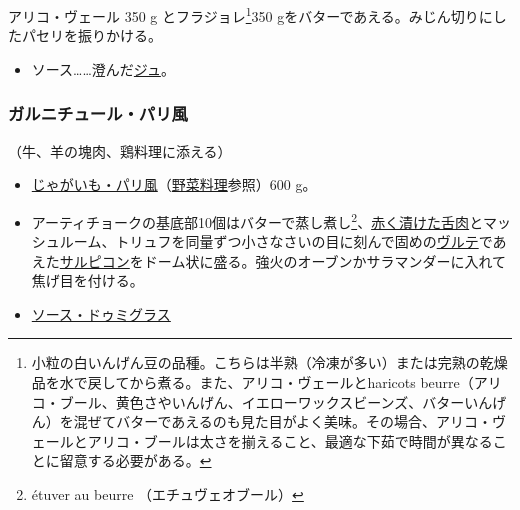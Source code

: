 \begin{recette}


アリコ・ヴェール 350 g とフラジョレ\footnote{小粒の白いんげん豆の品種。こちらは半熟（冷凍が多い）または完熟の乾燥品を水で戻してから煮る。また、アリコ・ヴェールとharicots
  beurre（アリコ・ブール、黄色さやいんげん、イエローワックスビーンズ、バターいんげん）を混ぜてバターであえるのも見た目がよく美味。その場合、アリコ・ヴェールとアリコ・ブールは太さを揃えること、最適な下茹で時間が異なることに留意する必要がある。}350
gをバターであえる。みじん切りにしたパセリを振りかける。

\begin{itemize}
\tightlist
\item
  ソース\ldots{}\ldots{}澄んだ\protect\hyperlink{jus-de-veau-lie}{ジュ}。
\end{itemize}

\hypertarget{garniture-a-la-parisienne}{%
\subsubsection{ガルニチュール・パリ風}\label{garniture-a-la-parisienne}}



（牛、羊の塊肉、鶏料理に添える）

\begin{itemize}
\item
  \protect\hyperlink{pommes-de-terre-a-la-parisienne}{じゃがいも・パリ風}（\protect\hyperlink{legumes}{野菜料理}参照）600
  g。
\item
  アーティチョークの基底部10個はバターで蒸し煮し\footnote{étuver au
    beurre （エチュヴェオブール）}、\protect\hyperlink{saumure-liquide-pour-langues}{赤く漬けた舌肉}とマッシュルーム、トリュフを同量ずつ小さなさいの目に刻んで固めの\protect\hyperlink{veloute}{ヴルテ}であえた\protect\hyperlink{salpicons-divers}{サルピコン}をドーム状に盛る。強火のオーブンかサラマンダーに入れて焦げ目を付ける。
\item
  \protect\hyperlink{sauce-demi-glace}{ソース・ドゥミグラス}
\end{itemize}


\end{recette}
